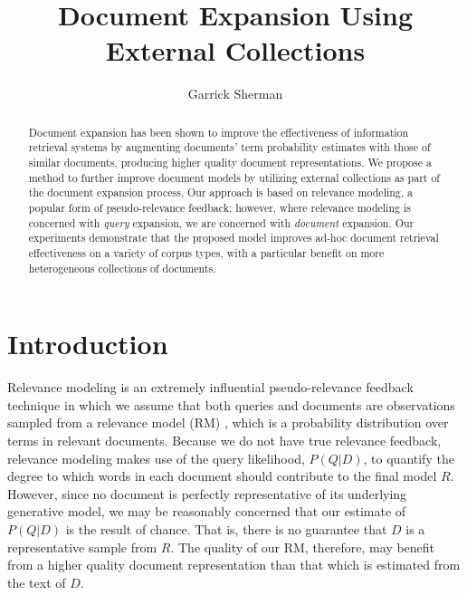 \documentclass[sigconf]{acmart}
\begin{document}
\author{Garrick Sherman}


\title{Document Expansion Using External Collections}

\begin{abstract}
Document expansion has been shown to improve the effectiveness of information retrieval systems by augmenting documents' term probability estimates with those of similar documents, producing higher quality document representations. We propose a method to further improve document models by utilizing external collections as part of the document expansion process. Our approach is based on relevance modeling, a popular form of pseudo-relevance feedback; however, where relevance modeling is concerned with \textit{query} expansion, we are concerned with \textit{document} expansion. Our experiments demonstrate that the proposed model improves ad-hoc document retrieval effectiveness on a variety of corpus types, with a particular benefit on more heterogeneous collections of documents.
\end{abstract}

\maketitle

\section{Introduction}\label{section.intro}


Relevance modeling is an extremely influential pseudo-relevance feedback technique in which we assume that both queries and documents are observations sampled from a relevance model (RM) \cite{Lavrenko2001}, which is a probability distribution over terms in relevant documents. Because we do not have true relevance feedback, relevance modeling makes use of the query likelihood, $P(Q|D)$, to quantify the degree to which words in each document should contribute to the final model $R$. However, since no document is perfectly representative of its underlying generative model, we may be reasonably concerned that our estimate of $P(Q|D)$ is the result of chance. That is, there is no guarantee that $D$ is a representative sample from $R$. The quality of our RM, therefore, may benefit from a higher quality document representation than that which is estimated from the text of $D$.
\end{document}

